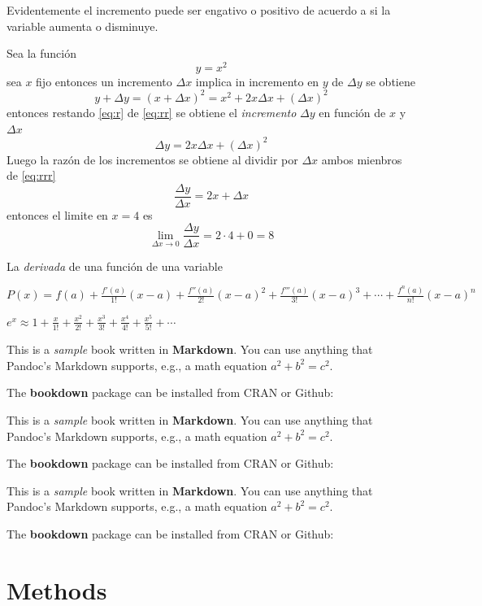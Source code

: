 \documentclass[]{krantz}
\begin{document}
Evidentemente el incremento puede ser engativo o positivo de acuerdo a si la variable aumenta o disminuye.

Sea la función
\begin{equation}
y=x^2
\label{eq:r}
\end{equation}
sea \(x\) fijo entonces un incremento \(\Delta x\) implica in incremento en \(y\) de \(\Delta y\) se obtiene
\begin{equation}
y+\Delta y=(x+\Delta x)^2=x^2+2x\Delta x+(\Delta x)^2
\label{eq:rr}
\end{equation}
entonces restando \eqref{eq:r} de \eqref{eq:rr} se obtiene el \emph{incremento} \(\Delta y\) en función de \(x\) y \(\Delta x\)
\begin{equation}
\Delta y=2x\Delta x+(\Delta x)^2
\label{eq:rrr}
\end{equation}
Luego la razón de los incrementos se obtiene al dividir por \(\Delta x\) ambos mienbros de \eqref{eq:rrr} \[\frac{\Delta y}{\Delta x}=2x+\Delta x\] entonces el limite en \(x=4\) es \[\lim_{\Delta x\to 0}\frac{\Delta y}{\Delta x}=2\cdot 4+0=8\]

La \emph{derivada} de una función de una variable

\(P(x)=f(a)+{\frac {f'(a)}{1!}}(x-a)+{\frac {f''(a)}{2!}}(x-a)^{2}+{\frac {f'''(a)}{3!}}(x-a)^{3}+\cdots +{\frac {f^{n}(a)}{n!}}(x-a)^{n}\)

\({\displaystyle e^{x}\approx 1+{\frac {x}{1!}}+{\frac {x^{2}}{2!}}+{\frac {x^{3}}{3!}}+{\frac {x^{4}}{4!}}+{\frac {x^{5}}{5!}}+\cdots }\)

This is a \emph{sample} book written in \textbf{Markdown}. You can use anything that Pandoc's Markdown supports, e.g., a math equation \(a^2 + b^2 = c^2\).

The \textbf{bookdown} package can be installed from CRAN or Github:

This is a \emph{sample} book written in \textbf{Markdown}. You can use anything that Pandoc's Markdown supports, e.g., a math equation \(a^2 + b^2 = c^2\).

The \textbf{bookdown} package can be installed from CRAN or Github:

This is a \emph{sample} book written in \textbf{Markdown}. You can use anything that Pandoc's Markdown supports, e.g., a math equation \(a^2 + b^2 = c^2\).

The \textbf{bookdown} package can be installed from CRAN or Github:

\hypertarget{methods}{%
\chapter{Methods}\label{methods}}
\end{document}
